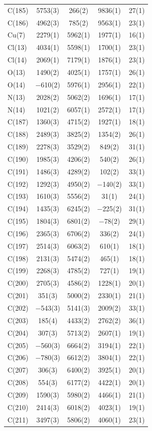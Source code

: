 \begin{center}
{\begin{supertabular}{lcccc}
C(185)&5753(3)&266(2)&9836(1)&27(1)\\
C(186)&4962(3)&785(2)&9563(1)&23(1)\\
Cu(7)&2279(1)&5962(1)&1977(1)&16(1)\\
Cl(13)&4034(1)&5598(1)&1700(1)&23(1)\\
Cl(14)&2069(1)&7179(1)&1876(1)&23(1)\\
O(13)&1490(2)&4025(1)&1757(1)&26(1)\\
O(14)&$-$610(2)&5976(1)&2956(1)&22(1)\\
N(13)&2028(2)&5062(2)&1696(1)&17(1)\\
N(14)&1021(2)&6057(1)&2572(1)&17(1)\\
C(187)&1360(3)&4715(2)&1927(1)&18(1)\\
C(188)&2489(3)&3825(2)&1354(2)&26(1)\\
C(189)&2278(3)&3529(2)&849(2)&31(1)\\
C(190)&1985(3)&4206(2)&540(2)&26(1)\\
C(191)&1486(3)&4289(2)&102(2)&33(1)\\
C(192)&1292(3)&4950(2)&$-$140(2)&33(1)\\
C(193)&1610(3)&5556(2)&31(1)&24(1)\\
C(194)&1435(3)&6245(2)&$-$225(2)&31(1)\\
C(195)&1804(3)&6801(2)&$-$78(2)&29(1)\\
C(196)&2365(3)&6706(2)&336(2)&24(1)\\
C(197)&2514(3)&6063(2)&610(1)&18(1)\\
C(198)&2131(3)&5474(2)&465(1)&18(1)\\
C(199)&2268(3)&4785(2)&727(1)&19(1)\\
C(200)&2705(3)&4586(2)&1228(1)&20(1)\\
C(201)&351(3)&5000(2)&2330(1)&21(1)\\
C(202)&$-$543(3)&5141(3)&2009(2)&33(1)\\
C(203)&185(4)&4433(2)&2762(2)&36(1)\\
C(204)&307(3)&5713(2)&2607(1)&19(1)\\
C(205)&$-$560(3)&6664(2)&3194(1)&22(1)\\
C(206)&$-$780(3)&6612(2)&3804(1)&22(1)\\
C(207)&306(3)&6400(2)&3925(1)&20(1)\\
C(208)&554(3)&6177(2)&4422(1)&20(1)\\
C(209)&1590(3)&5980(2)&4466(1)&21(1)\\
C(210)&2414(3)&6018(2)&4023(1)&19(1)\\
C(211)&3497(3)&5806(2)&4060(1)&23(1)\\

\end{supertabular}}
\end{center}
